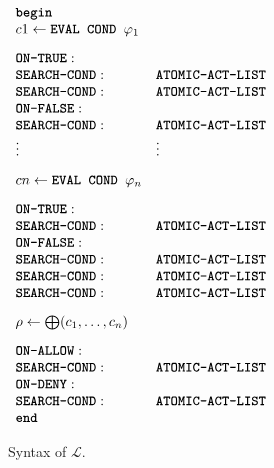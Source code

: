 \documentclass{sig-alternate}
\newcommand{\state}{\ensuremath{\pi}\xspace}
\newcommand{\policyfunc}{\ensuremath{\Psi}\xspace}
\newcommand{\funcname}[1]{\textbf{\texttt{#1}}}
\newcommand{\policy}{\ensuremath{\varphi}\xspace}
\newcommand{\cL}{\ensuremath{\mathcal{L}}\xspace}
\begin{document}
\begin{figure}[t]
\centering
$
\begin{array}{lll}
\funcname{begin}   & & \\
 c1 \leftarrow   \funcname{EVAL COND  } \policy_1 &  &\\[2ex]
     \funcname{ON-TRUE}: & &\\
       \funcname{SEARCH-COND}: &\funcname{ATOMIC-ACT-LIST}&\\
       \funcname{SEARCH-COND}: &\funcname{ATOMIC-ACT-LIST}&\\
     \funcname{ON-FALSE}: & &\\
       \funcname{SEARCH-COND}: &\funcname{ATOMIC-ACT-LIST}&\\
  \vdots & \vdots & \\[2ex]
 cn \leftarrow  \funcname{EVAL COND  } \policy_n &  &\\[2ex]
     \funcname{ON-TRUE}: & &\\
       \funcname{SEARCH-COND}: &\funcname{ATOMIC-ACT-LIST}&\\
     \funcname{ON-FALSE}: & &\\
       \funcname{SEARCH-COND}: &\funcname{ATOMIC-ACT-LIST}&\\
       \funcname{SEARCH-COND}: &\funcname{ATOMIC-ACT-LIST}&\\
       \funcname{SEARCH-COND}: &\funcname{ATOMIC-ACT-LIST}&\\[2ex]
 \rho\leftarrow  \bigoplus(c_1,\ldots,c_n)  & &\\[2ex]
     \funcname{ON-ALLOW}: & &\\
       \funcname{SEARCH-COND}: &\funcname{ATOMIC-ACT-LIST}&\\
     \funcname{ON-DENY}: & &\\
       \funcname{SEARCH-COND}: &\funcname{ATOMIC-ACT-LIST}&\\
\funcname{end}    & &
\end{array}
$
\caption{Syntax of \cL.\label{fig:syntax}} 
\end{figure}
\end{document}
